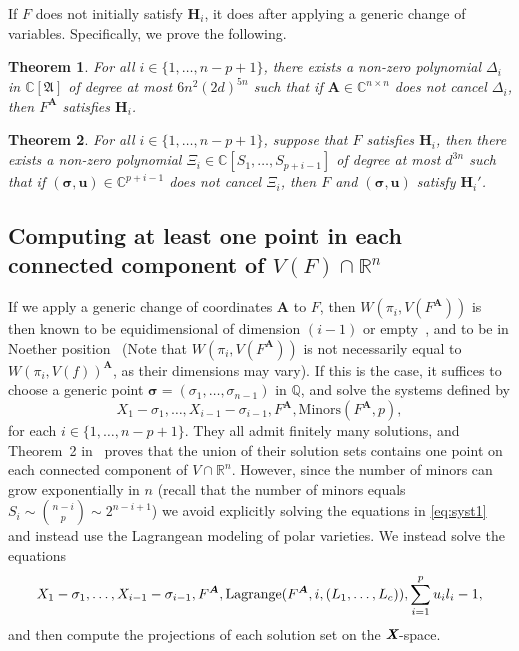 \documentclass[a4paper]{article}
\def\A{\mathfrak{A}}
\def\Xb{\textit{\textbf{X}}}
\def\mA{{\bm A}}
\def\ub{{\bm u}}
\def\D{\Delta}
\def\minorsA{\textrm{Minors}(F^{\mA},p)}
\DeclareMathOperator{\lag}{Lagrange}
\def\C{\mathbb{C}}
\def\Q{\mathbb{Q}}
\def\R{\mathbb{R}}
\def\WiA{W(\pi_i,V(F^{\mA}))}
\def\lagFA{{\bm\lag}(F^{\mA},i,(L_1,\hdots,L_c))}
\def\udl{\sum_{i=1}^pu_il_i}
\newtheorem{theorem}{Theorem}[section]
\begin{document}
\noindent
If $F$ does not initially satisfy $\textbf{H}_i$, it does after applying a generic change of variables. Specifically, we prove the following.  
%
\begin{theorem}\label{theo:gen}
  For all $i\in\{1,\dots,n-p+1\}$, there exists a non-zero polynomial $\D_i$ in
  $\C[\A]$ of degree at most $6n^2(2d)^{5n}$ such that if $\mA \in
  \C^{n\times n}$ does not cancel $\D_i$, then
  $F^\mA$ satisfies $\textbf{H}_i$.
\end{theorem}
%
\begin{theorem}\label{theo:Hp}
  For all $i\in\{1,\dots,n-p+1\}$, suppose that $F$ satisfies $\textbf{H}_i$, then there exists a non-zero
  polynomial $\Xi_{i} \in \C[S_1,\dots,S_{p+i-1}]$ of degree at most
  $d^{3n}$ such that if $(\bm \sigma,\ub) \in \C^{p+i-1}$ does not
  cancel $\Xi_{i}$, then $F$ and $(\bm \sigma,\ub)$ satisfy $\textbf{H}_i'$.
\end{theorem}



















\subsection{Computing at least one point in each connected component of $V(F) \cap \R^n$} 
%
If we apply a generic change of coordinates $\mA$ to $F$, then $\WiA$ is then known to be equidimensional of dimension $(i-1)$ or
empty~\cite{BaGiHeMb97}, and to be in Noether
  position~\cite{EMP} (Note that $\WiA$ is not necessarily equal to $W(\pi_i,V(f))^{\mA}$, as their dimensions may vary). If this is the case, it suffices to choose a generic point
$\bm \sigma = (\sigma_1,\dots,\sigma_{n-1})$ in $\Q$, and solve the systems defined
by
%
\begin{equation}\label{eq:syst1}
X_1-\sigma_1,\dots,X_{i-1}-\sigma_{i-1}, F^{\mA},  \minorsA,  
\end{equation}
%
for each $i\in \{1,\dots,n-p+1\}$.  They all admit finitely many solutions, and
Theorem~2 in~\cite{EMP} proves that the union of their solution sets
contains one point on each connected component of $V \cap \R^n$. However, since the number of minors can grow exponentially in $n$ (recall that the number of minors equals $S_i \sim  \binom{n-i}{p}\sim 2^{n-i+1}$)
we avoid explicitly solving the equations in \eqref{eq:syst1} and instead use the Lagrangean modeling of polar varieties. We instead solve the equations
%
\begin{equation}\label{eq:syst2}
X_1-\sigma_1,\dots,X_{i-1}-\sigma_{i-1}, F^{\mA}, \lagFA ,\udl-1,
\end{equation}
%
and then compute the projections of each solution set on the $\Xb$-space.
\end{document}
